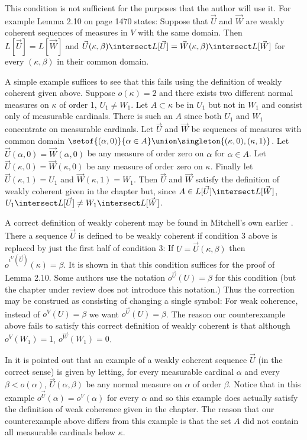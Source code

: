 \documentclass[oneside,12pt]{amsart}
\begin{document}
This condition is not sufficient for the purposes that the author will use it. For example Lemma 2.10 on
page 1470 states: Suppose that $\vec{U}$ and $\vec{W}$ are weakly coherent sequences of measures in $V$ with
the same domain. Then $L[\vec{U}] = L[\vec{W}]$ and $\vec{U}(\kappa,\beta)\intersect L[\vec{U}] =
\vec{W}(\kappa,\beta)\intersect L[\vec{W}]$ for every $(\kappa,\beta)$ in their common domain.

A simple example suffices to see that this fails using the definition of weakly coherent given above. Suppose
$o(\kappa) = 2$ and there exists two different normal measures on $\kappa$ of order 1,
$U_1\not=W_1$. Let $A\subset \kappa$ be in $U_1$ but
not in $W_1$ and consist only of measurable cardinals. There is such an $A$ since both $U_1$ and $W_1$ concentrate
on measurable cardinals.
 Let $\vec{U}$ and $\vec{W}$ be sequences of measures with common domain
$\setof{(\alpha, 0)}{\alpha \in A} \union \singleton{(\kappa, 0), (\kappa, 1)}$. Let
$\vec{U}(\alpha, 0) = \vec{W}(\alpha, 0)$ be any measure of order zero on $\alpha$ for $\alpha \in A$.
Let $\vec{U}(\kappa, 0) = \vec{W}(\kappa, 0)$ be any measure of order zero on $\kappa$. Finally
let $\vec{U}(\kappa, 1) = U_1$ and $\vec{W}(\kappa, 1) = W_1$. Then $\vec{U}$ and $\vec{W}$ satisfy
the definition of weakly coherent given in the chapter but, since $A\in L[\vec{U}]\intersect L[\vec{W}]$,
$U_1\intersect L[\vec{U}] \not= W_1\intersect L[\vec{W}]$.

A correct definition of weakly coherent may be found in Mitchell's own earlier \cite{Mitchell-Revisited}.
There a sequence $\vec{U}$ is defined to be weakly coherent
if condition 3 above is replaced by just the first half of condition 3:
If $U=\vec{U}(\kappa, \beta)$ then $o^{i^{U}(\vec{U})}(\kappa) = \beta$.
It is shown in \cite{Mitchell-Revisited} that this
condition suffices for the proof of Lemma 2.10.
Some authors use the notation
$o^{\vec{U}}(U) = \beta$ for this condition (but the chapter under review does not introduce this notation.)
Thus the correction may be construed as consisting of changing a single symbol:
For weak coherence, instead of $o^V(U) = \beta$ we want $o^{\vec{U}}(U) = \beta$. The reason our
counterexample above fails to satisfy this correct definition of weakly coherent is that although
$o^{V}(W_1) = 1$, $o^{\vec{W}}(W_1) = 0$.

In \cite{Mitchell-Revisited} it is pointed out that an example of a weakly coherent sequence
$\vec{U}$ (in the correct sense) is given by letting, for every measurable cardinal $\alpha$ and every $\beta<o(\alpha)$,
$\vec{U}(\alpha,\beta)$ be any normal measure on $\alpha$ of order $\beta$. Notice that in
this example $o^{\vec{U}}(\alpha) = o^V(\alpha)$ for every $\alpha$ and so this example does
actually satisfy the definition of weak coherence given in the chapter. The reason that our
counterexample above differs from this example is that the set $A$ did not contain all measurable
cardinals below $\kappa$.
\end{document}
